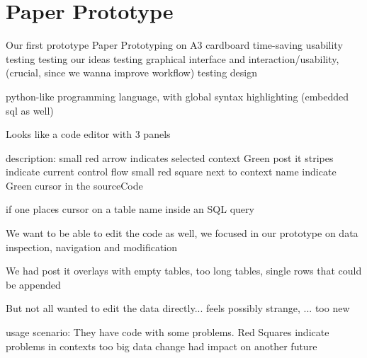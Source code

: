 
\section{Paper Prototype}
\label{sec:PAPER_PROTOTYPE}


Our first prototype 
Paper Prototyping
on A3 cardboard
time-saving
usability testing
testing our ideas
testing graphical interface and interaction/usability, (crucial, since we wanna improve workflow)
testing design 

python-like programming language, with global syntax highlighting (embedded sql as well)

Looks like a code editor
with 3 panels

description:
small red arrow indicates selected context
Green post it stripes indicate current control flow
small red square next to context name indicate
Green cursor in the sourceCode

if one places cursor on a table name inside an SQL query


We want to be able to edit the code as well, we focused in our prototype on data inspection, navigation and modification

We had post it overlays with empty tables, too long tables, single rows that could be appended

But not all wanted to edit the data directly... feels possibly strange, ... too new





usage scenario:
  They have code with some problems.
  Red Squares indicate problems in contexts
  too big data
  change had impact on another
  future

